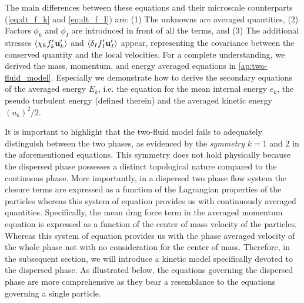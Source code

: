 The main differences between these equations and their microscale counterparts (\ref{eq:dt_f_k} and \ref{eq:dt_f_I}) are:
(1) The unknowns are averaged quantities,
(2) Factors $\phi_k$ and $\phi_I$ are introduced in front of all the terms, and
(3) The additional stresses $\left<\chi_k f_k' \textbf{u}_k'\right>$ and $\left<\delta_I f_I' \textbf{u}_I'\right>$ appear, representing the covariance between the conserved quantity and the local velocities.  
For a complete understanding, we derived the mass, momentum, and energy averaged equations in \ref{ap:two-fluid_model}. 
Especially we demonstrate how to derive the secondary equations of the averaged energy $E_k$, i.e. the equation for the mean internal energy $e_k$, the pseudo turbulent energy (defined therein) and the averaged kinetic energy $(u_k)^2/2$.  

It is important to highlight that the two-fluid model fails to adequately distinguish between the two phases, as evidenced by the \textit{symmetry} $k = 1$ and $2$ in the aforementioned equations. This symmetry does not hold physically because the dispersed phase possesses a distinct topological nature compared to the continuous phase. 
More importantly, in a dispersed two phase flow system the closure terms are expressed as a function of the Lagrangian properties of the particles whereas this system of equation provides us with continuously averaged quantities. 
Specifically, the mean drag force term in the averaged momentum equation is expressed as a function of the  center of mass velocity of the particles. 
Whereas this system of equation provides us with the phase averaged velocity of the whole phase not with no consideration for the center of mass.  
Therefore, in the subsequent section, we will introduce a kinetic model specifically devoted to the dispersed phase. 
As illustrated below, the equations governing the dispersed phase are more comprehensive as they bear a resemblance to the equations governing a single particle.

